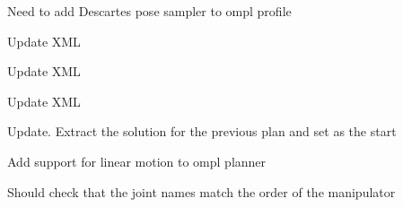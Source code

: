 \begin{DoxyRefList}
\label{todo__todo000025}%
%
Need to add Descartes pose sampler to ompl profile  
\item[Member \mbox{\hyperlink{classtesseract__planning_1_1OMPLDefaultPlanProfile_a46c010d4fcdb918631ac92016d3bfccd}{tesseract\+\_\+planning\+::OMPLDefault\+Plan\+Profile\+::OMPLDefault\+Plan\+Profile}} (const tinyxml2\+::\+XMLElement \&xml\+\_\+element)]\label{todo__todo000023}%
%
Update XML 

\label{todo__todo000022}%
%
Update XML  
\item[Member \mbox{\hyperlink{classtesseract__planning_1_1OMPLDefaultPlanProfile_a9ceeaf8d8a01e483992a71b15cb32df4}{tesseract\+\_\+planning\+::OMPLDefault\+Plan\+Profile\+::to\+XML}} (tinyxml2\+::\+XMLDocument \&doc) const override]\label{todo__todo000027}%
%
Update XML  
\item[Member \mbox{\hyperlink{classtesseract__planning_1_1OMPLMotionPlanner_a26896a1ffb6a331553b3e7dec2af8684}{tesseract\+\_\+planning\+::OMPLMotion\+Planner\+::create\+Problems}} (const \mbox{\hyperlink{structtesseract__planning_1_1PlannerRequest}{Planner\+Request}} \&request) const]\label{todo__todo000020}%
%
Update. Extract the solution for the previous plan and set as the start 

\label{todo__todo000019}%
%
Add support for linear motion to ompl planner 

\label{todo__todo000018}%
%
Should check that the joint names match the order of the manipulator 


\end{DoxyRefList}
